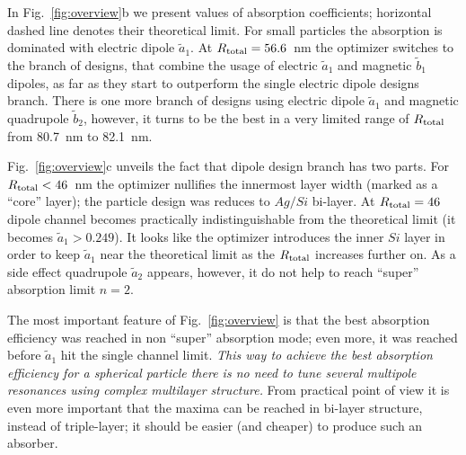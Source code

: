 \documentclass[aps,prl,twocolumn,showpacs,superscriptaddress,groupedaddress]{revtex4-1}
\begin{document}
In Fig.~\ref{fig:overview}b we present values of absorption
coefficients; horizontal dashed line denotes their theoretical limit.
For small particles the absorption is dominated with electric dipole
$\tilde{a}_1$.  At $R_{\rm total} = 56.6$~nm the optimizer switches to
the branch of designs, that combine the usage of electric
$\tilde{a}_1$ and magnetic $\tilde{b}_1$ dipoles, as far as they start
to outperform the single electric dipole designs branch.  There is one
more branch of designs using electric dipole $\tilde{a}_1$ and
magnetic quadrupole $\tilde{b}_2$, however, it turns to be the best in
a very limited range of $R_{\rm total}$ from 80.7~nm to 82.1~nm.

Fig.~\ref{fig:overview}c unveils the fact that dipole design branch has
two parts. For $R_{\rm total}<46$~nm the optimizer nullifies the
innermost layer width (marked as a ``core'' layer); the particle
design was reduces to $Ag/Si$ bi-layer.  At $R_{\rm total}=46$ dipole
channel becomes practically indistinguishable from the theoretical
limit (it becomes $\tilde{a}_1>0.249$).  It looks like the optimizer
introduces the inner $Si$ layer in order to keep $\tilde{a}_1$ near
the theoretical limit as the $R_{\rm total}$ increases further on.  As
a side effect quadrupole $\tilde{a}_2$ appears, however, it do not
help to reach ``super'' absorption limit $n=2$.

The most important feature of Fig.~\ref{fig:overview} is that the best
absorption efficiency was reached in non ``super'' absorption mode;
even more, it was reached before $\tilde{a}_1$ hit the single channel
limit.  \textit{This way to achieve the best absorption efficiency for a
spherical particle there is no
need to tune several multipole resonances using complex multilayer
structure.}  From practical point of view it is even more important that
the maxima can be reached in bi-layer structure, instead of
triple-layer; it should be easier (and cheaper) to produce such an
absorber.
\end{document}
